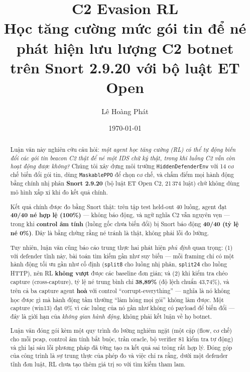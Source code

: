 \documentclass[12pt,a4paper]{report}
\title{\textbf{C2 Evasion RL}\\[4pt]
Học tăng cường mức gói tin để né phát hiện lưu lượng C2 botnet\\
trên Snort 2.9.20 với bộ luật ET Open}
\author{Lê Hoàng Phát}
\date{\today}
\begin{document}
\maketitle

\begin{abstract}
\noindent
Luận văn này nghiên cứu câu hỏi: \emph{một agent học tăng cường (RL) có thể tự động
biến đổi các gói tin beacon C2 thật để né một IDS chữ ký thật, trong khi luồng C2
vẫn còn hoạt động được không?} Chúng tôi xây dựng môi trường \texttt{HiddenDefenderEnv}
với 14 cơ chế biến đổi gói tin, dùng \texttt{MaskablePPO} để chọn cơ chế, và chấm điểm
mọi hành động bằng chính nhị phân \textbf{Snort 2.9.20} (bộ luật ET Open C2, 21\,374
luật) chứ không dùng mô hình xấp xỉ khi đo kết quả chính.

Kết quả chính được đo bằng Snort thật: trên tập test held-out 40 luồng, agent đạt
\textbf{40/40 né hợp lệ (100\%)} — không báo động, và ngữ nghĩa C2 vẫn nguyên vẹn —
trong khi \textbf{control âm tính} (luồng gốc chưa biến đổi) bị Snort báo động
\textbf{40/40 (tỷ lệ né 0\%)}. Đây là bằng chứng rằng né tránh là thật, không phải
lỗi đo lường.

Tuy nhiên, luận văn cũng báo cáo trung thực hai phát hiện \emph{phủ định} quan trọng:
(1) với defender tĩnh này, bài toán tìm kiếm gần như suy biến — mỗi framing chỉ có một
hành động tối ưu gần như cố định (\texttt{split8} cho luồng nhị phân, \texttt{split24}
cho luồng HTTP), nên RL \textbf{không vượt} được các baseline đơn giản; và (2) khi
kiểm tra chéo capture (cross-capture), tỷ lệ né trung bình chỉ \textbf{38{,}89\%}
(độ lệch chuẩn 43{,}74\%), và trên cả ba capture agent \textbf{hoà} với control
``corrupt-everything'' — nghĩa là nó không học được gì mà hành động tầm thường
``làm hỏng mọi gói'' không làm được. Một capture (win13) đạt 0\% vì các luồng của nó
gần như không có payload để biến đổi — đây là giới hạn của \emph{không gian hành động},
không phải kết luận về họ botnet.

Luận văn đóng gói kèm một quy trình đo lường nghiêm ngặt (một cặp (flow, cơ chế) cho
mỗi pcap, control âm tính bắt buộc, trần oracle, bộ verifier 81 kiểm tra tự động) và
ghi lại sáu lỗi phương pháp đã từng tạo ra kết quả sai trông rất hợp lý. Đóng góp của
công trình là sự trung thực của phép đo và việc chỉ ra rằng, dưới một defender tĩnh
đơn luật, RL chưa tạo thêm giá trị so với tìm kiếm tham lam.
\end{abstract}

\tableofcontents
\listoftables
\listoffigures
\end{document}
